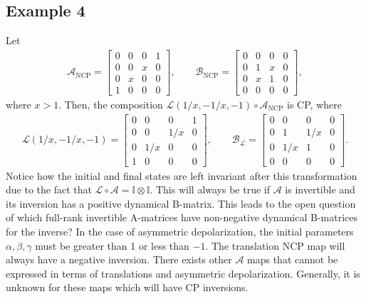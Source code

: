 \documentclass[12pt]{iopart}
\begin{document}
\subsection{Example 4}\label{subsec:ex4Repolar}
Let
\begin{align}
\mathcal{A}_\text{NCP}=\begin{bmatrix}
0 &0 &0 &1\\
0 &0 &x &0\\
0 &x &0 &0\\
1 &0 &0 &0
\end{bmatrix},
\qquad
\mathcal{B}_\text{NCP}=\begin{bmatrix}
0 &0 &0 &0\\
0 &1 &x &0\\
0 &x &1 &0\\
0 &0 &0 &0
\end{bmatrix},
\end{align}
where $x>1$. Then, the composition $\mathcal{L}(1/x,-1/x,-1)\circ \mathcal{A}_\text{NCP}$ is CP, where
\begin{align}
\mathcal{L}(1/x,-1/x,-1)=\begin{bmatrix}
0 &0 &0 &1\\
0 &0 &1/x &0\\
0 &1/x &0 &0\\
1 &0 &0 &0
\end{bmatrix},
\qquad
\mathcal{B}_{\mathcal{L}}=\begin{bmatrix}
0 &0 &0 &0\\
0 &1 &1/x &0\\
0 &1/x &1 &0\\
0 &0 &0 &0
\end{bmatrix}.
\end{align}
Notice how the initial and final states are left invariant after this transformation due to the fact that $\mathcal{L} \circ \mathcal{A} = \mathbb{I} \otimes \mathbb{I}$. This will always be true if $\mathcal{A}$ is invertible and its inversion has a positive dynamical B-matrix. This leads to the open question of which full-rank invertible A-matrices have non-negative dynamical B-matrices for the inverse? In the case of asymmetric depolarization, the initial parameters $\alpha, \beta, \gamma$ must be greater than 1 or less than $-1$. The translation NCP map will always have a negative inversion. There exists other $\mathcal{A}$ maps that cannot be expressed in terms of translations and asymmetric depolarization. Generally, it is unknown for these maps which will have CP inversions.
\end{document}
